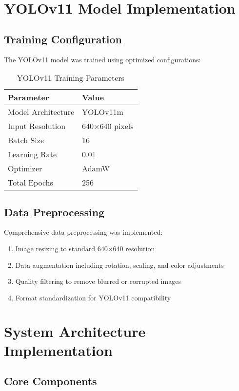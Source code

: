 \section{YOLOv11 Model Implementation}

\subsection{Training Configuration}

The YOLOv11 model was trained using optimized configurations:

\begin{table}[h]
\centering
\caption{YOLOv11 Training Parameters}
\begin{tabular}{|l|l|}
\hline
\textbf{Parameter} & \textbf{Value} \\
\hline
Model Architecture & YOLOv11m \\
Input Resolution & 640×640 pixels \\
Batch Size & 16 \\
Learning Rate & 0.01 \\
Optimizer & AdamW \\
Total Epochs & 256 \\
\hline
\end{tabular}
\end{table}

\subsection{Data Preprocessing}

Comprehensive data preprocessing was implemented:

\begin{enumerate}
    \item Image resizing to standard 640×640 resolution
    \item Data augmentation including rotation, scaling, and color adjustments
    \item Quality filtering to remove blurred or corrupted images
    \item Format standardization for YOLOv11 compatibility
\end{enumerate}

\section{System Architecture Implementation}

\subsection{Core Components}


